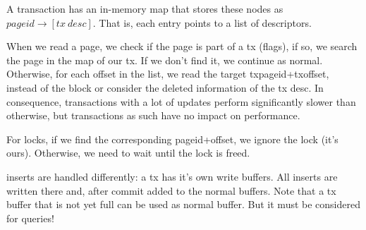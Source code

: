 \documentclass{scrartcl}
\begin{document}
A transaction has an in-memory map that stores these nodes as
$pageid \rightarrow [tx\ desc]$. That is, each entry points
to a list of descriptors.

When we read a page, we check if the page is part of a tx (flags),
if so, we search the page in the map of our tx. If we don't find it,
we continue as normal.
Otherwise, for each offset in the list, we read the target txpageid+txoffset,
instead of the block or consider the deleted information of the tx desc.
In consequence, transactions with a lot of updates perform significantly
slower than otherwise, but transactions as such have no impact on performance.

For locks, if we find the corresponding pageid+offset, we ignore the lock
(it's ours). Otherwise, we need to wait until the lock is freed.

inserts are handled differently: a tx has it's own write buffers.
All inserts are written there and, after commit added to the normal buffers.
Note that a tx buffer that is not yet full can be used as normal buffer.
But it must be considered for queries!
\end{document}
